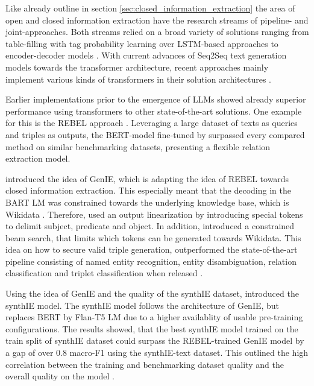 \documentclass[a4paper,oneside,bibliography=totoc]{scrbook}
\begin{document}
Like already outline in section \ref{sec:closed_information_extraction} the area of open and closed information extraction have the research streams of pipeline- and joint-approaches. Both streams relied on a broad variety of solutions ranging from table-filling with tag probability learning over LSTM-based approaches to encoder-decoder models \cite{Zhang2022,Angeli2015,Trisedya2019}. With current advances of Seq2Seq text generation models towards the transformer architecture, recent approaches mainly implement various kinds of transformers in their solution architectures \cite{Josifoski2021,Josifoski2023,Moeller2024}.

Earlier implementations prior to the emergence of \acp{LLM} showed already superior performance using transformers to other state-of-the-art solutions. One example for this is the REBEL approach \cite{HuguetCabot2021}. Leveraging a large dataset of texts as queries and triples as outputs, the BERT-model fine-tuned by \citet{HuguetCabot2021} surpassed every compared method on similar benchmarking datasets, presenting a flexible relation extraction model.

\citet{Josifoski2021} introduced the idea of GenIE, which is adapting the idea of REBEL towards closed information extraction. This especially meant that the decoding in the BART \ac{LM} was constrained towards the underlying knowledge base, which is Wikidata \cite{Josifoski2021}. Therefore, \citet{Josifoski2021} used an output linearization by introducing special tokens to delimit subject, predicate and object. In addition, \cite{Josifoski2021} introduced a constrained beam search, that limits which tokens can be generated towards Wikidata. This idea on how to secure valid triple generation, outperformed the state-of-the-art pipeline consisting of named entity recognition, entity disambiguation, relation classification and triplet classification when released \cite{Josifoski2021}.

Using the idea of GenIE and the quality of the synthIE dataset, \citet{Josifoski2023} introduced the synthIE model. The synthIE model follows the architecture of GenIE, but replaces BERT by Flan-T5 \ac{LM} due to a higher availablity of usable pre-training configurations. The results showed, that the best synthIE model trained on the train split of synthIE dataset could surpass the REBEL-trained GenIE model by a gap of over 0.8 macro-F1 using the synthIE-text dataset. This outlined the high correlation between the training and benchmarking dataset quality and the overall quality on the model \cite{Josifoski2023}.
\end{document}
